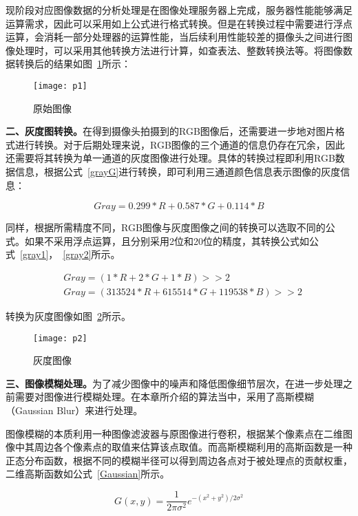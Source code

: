 现阶段对应图像数据的分析处理是在图像处理服务器上完成，服务器性能能够满足运算需求，因此可以采用如上公式进行格式转换。但是在转换过程中需要进行浮点运算，会消耗一部分处理器的运算性能，当后续利用性能较差的摄像头之间进行图像处理时，可以采用其他转换方法进行计算，如查表法、整数转换法等。将图像数据转换后的结果如图~\ref{p1}所示：

\begin{figure}[H] 
  \centering
  \texttt{[image: p1]}
  \caption{原始图像}
  \label{p1}
\end{figure}

\textbf{二、灰度图转换。}在得到摄像头拍摄到的RGB图像后，还需要进一步地对图片格式进行转换。对于后期处理来说，RGB图像的三个通道的信息仍存在冗余，因此还需要将其转换为单一通道的灰度图像进行处理。具体的转换过程即利用RGB数据信息，根据公式~\ref{grayG}进行转换，即可利用三通道颜色信息表示图像的灰度信息：

\begin{equation}
Gray = 0.299 * R + 0.587 * G + 0.114 * B
  \label{grayG}
\end{equation}

同样，根据所需精度不同，RGB图像与灰度图像之间的转换可以选取不同的公式。如果不采用浮点运算，且分别采用2位和20位的精度，其转换公式如公式~\ref{gray1}，~\ref{gray2}所示。

\begin{align}
& Gray = (1 * R + 2 * G + 1 * B) >> 2
  \label{gray1} \\
& Gray = (313524 * R + 615514 * G + 119538 * B) >> 2
  \label{gray2}
\end{align}

转换为灰度图像如图~\ref{p2}所示。

\begin{figure}[h] 
  \centering
  \texttt{[image: p2]}
  \caption{灰度图像}
  \label{p2}
\end{figure}

\textbf{三、图像模糊处理。}为了减少图像中的噪声和降低图像细节层次，在进一步处理之前需要对图像进行模糊处理。在本章所介绍的算法当中，采用了高斯模糊（Gaussian Blur）来进行处理。

图像模糊的本质利用一种图像滤波器与原图像进行卷积，根据某个像素点在二维图像中其周边各个像素点的取值来估算该点取值。而高斯模糊利用的高斯函数是一种正态分布函数，根据不同的模糊半径可以得到周边各点对于被处理点的贡献权重，二维高斯函数如公式~\ref{Gaussian}所示。

\begin{equation}
G(x,y) = \frac{1}{2 \pi \sigma^2}e^{-(x^2+y^2)/2\sigma ^2}
  \label{Gaussian}
\end{equation}

